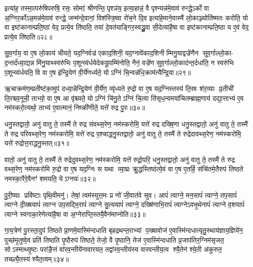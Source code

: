 इत्या॑ह॒ तस्मा॒त्परु॑षिपरुषि॒ रसः॒ सोमꣵ॑ श्रीणन्ति॒ पृश्ञ॑य॒ इत्या॒हान्नं॒ वै पृश्न्यन्न॑मे॒वाव॑ रुन्द्धे॒ऽर्को वा अ॒ग्निर॒र्कोऽन्न॒मन्न॑मे॒वाव॑ रुन्द्धे॒ जन्म॑न्दे॒वानां॒ विश॑स्त्रि॒ष्वा रो॑च॒ने दि॒व इत्या॑हे॒माने॒वास्मै॑ लो॒काञ्ज्योति॑ष्मतः करोति॒ यो वा इष्ट॑कानाम्प्रति॒ष्ठां वेद॒ प्रत्ये॒व ति॑ष्ठति॒ तया॑ दे॒वत॑याङ्गिर॒स्वद्ध्रु॒वा सी॒देत्या॑है॒षा वा इष्ट॑कानाम्प्रति॒ष्ठा य ए॒वं वेद॒ प्रत्ये॒व ति॑ष्ठति॥२८॥

{\anuvakamend[{रू॒पाणि॒ सूद॑दोहस॒स्तया॒ षोड॑श च॥६॥}]}

सु॒व॒र्गाय॒ वा ए॒ष लो॒काय॑ चीयते॒ यद॒ग्निर्वज्र॑ एकाद॒शिनी॒ यद॒ग्नावे॑काद॒शिनीम्मिनु॒याद्वज्रे॑णैन सुव॒र्गाल्लो॒का- द॒न्तर्द॑ध्या॒द्यन्न मि॑नु॒याथ्स्वरु॑भिः प॒शून्व्य॑र्धयेदेकयू॒पम्मि॑नोति॒ नैनं॒ वज्रे॑ण सुव॒र्गाल्लो॒काद॑न्त॒र्दधा॑ति॒ न स्वरु॑भिः प॒शून्व्य॑र्धयति॒ वि वा ए॒ष इ॑न्द्रि॒येण॑ वी॒र्ये॑णर्ध्यते॒ योऽग्निं चि॒न्वन्न॑धि॒क्राम॑त्यैन्द्रि॒या॥२९॥

ऋ॒चाक्रम॑ण॒म्प्रतीष्ट॑का॒मुप॑ दध्या॒न्नेन्द्रि॒येण॑ वी॒र्ये॑ण॒ व्यृ॑ध्यते रु॒द्रो वा ए॒ष यद॒ग्निस्तस्य॑ ति॒स्रः श॑र॒व्याः प्र॒तीची॑ ति॒रश्च्य॒नूची॒ ताभ्यो॒ वा ए॒ष आ वृ॑श्च्यते॒ योऽग्निं चि॑नु॒तेऽग्निं चि॒त्वा ति॑सृध॒न्वमया॑चितम्ब्राह्म॒णाय॑ दद्या॒त्ताभ्य॑ ए॒व नम॑स्करो॒त्यथो॒ ताभ्य॑ ए॒वात्मानं॒ निष्क्री॑णीते॒ यत्ते॑ रुद्र पु॒रः॥३०॥

धनु॒स्तद्वातो॒ अनु॑ वातु ते॒ तस्मै॑ ते रुद्र संवथ्स॒रेण॒ नम॑स्करोमि॒ यत्ते॑ रुद्र दख्षि॒णा धनु॒स्तद्वातो॒ अनु॑ वातु ते॒ तस्मै॑ ते रुद्र परिवथ्स॒रेण॒ नम॑स्करोमि॒ यत्ते॑ रुद्र प॒श्चाद्धनु॒स्तद्वातो॒ अनु॑ वातु ते॒ तस्मै॑ ते रुद्रेदावथ्स॒रेण॒ नम॑स्करोमि॒ यत्ते॑ रुद्रोत्त॒राद्धनु॒स्तत्॥३१॥

वातो॒ अनु॑ वातु ते॒ तस्मै॑ ते रुद्रेदुवथ्स॒रेण॒ नम॑स्करोमि॒ यत्ते॑ रुद्रो॒परि॒ धनु॒स्तद्वातो॒ अनु॑ वातु ते॒ तस्मै॑ ते रुद्र वथ्स॒रेण॒ नम॑स्करोमि रु॒द्रो वा ए॒ष यद॒ग्निः स यथा व्या॒घ्रः क्रु॒द्धस्तिष्ठ॑त्ये॒वं वा ए॒ष ए॒तर्\mbox{}हि॒ संचि॑तमे॒तैरुप॑ तिष्ठते नमस्का॒रैरे॒वैनꣳ॑ शमयति॒ येऽग्नयः॑॥३२॥

पु॒री॒ष्याः प्रवि॑ष्टाः पृथि॒वीमनु॑। तेषां॒ त्वम॑स्युत्त॒मः प्र णो॑ जी॒वात॑वे सुव। आपं॑ त्वाग्ने॒ मन॒सापं॑ त्वाग्ने॒ तप॒सापं॑ त्वाग्ने दी॒ख्षयापं॑ त्वाग्न उप॒सद्भि॒रापं॑ त्वाग्ने सु॒त्ययापं॑ त्वाग्ने॒ दख्षि॑णाभि॒रापं॑ त्वाग्नेऽवभृ॒थेनापं॑ त्वाग्ने व॒शयापं॑ त्वाग्ने स्वगाका॒रेणेत्या॑है॒षा वा अ॒ग्नेराप्ति॒स्तयै॒वैन॑माप्नोति॥३३॥

{\anuvakamend[{ऐ॒न्द्रि॒या पु॒र उ॑त्त॒राद्धनु॒स्तद॒ग्नय॑ आहा॒ष्टौ च॑॥७॥}]}

गा॒य॒त्रेण॑ पु॒रस्ता॒दुप॑ तिष्ठते प्रा॒णमे॒वास्मि॑न्दधाति बृहद्रथन्त॒राभ्यां प॒ख्षावोज॑ ए॒वास्मि॑न्दधात्यृतु॒स्थाय॑ज्ञाय॒ज्ञिये॑न॒ पुच्छ॑मृ॒तुष्वे॒व प्रति॑ तिष्ठति पृ॒ष्ठैरुप॑ तिष्ठते॒ तेजो॒ वै पृ॒ष्ठानि॒ तेज॑ ए॒वास्मि॑न्दधाति प्र॒जाप॑तिर॒ग्निम॑सृजत॒ सोऽस्माथ्सृ॒ष्टः परा॑ङै॒त्तं वा॑रव॒न्तीये॑नावारयत॒ तद्वा॑रव॒न्तीय॑स्य वारवन्तीय॒त्व श्यै॒तेन॑ श्ये॒ती अ॑कुरुत॒ तच्छ्यै॒तस्य॑ श्यैत॒त्वम्॥३४॥

